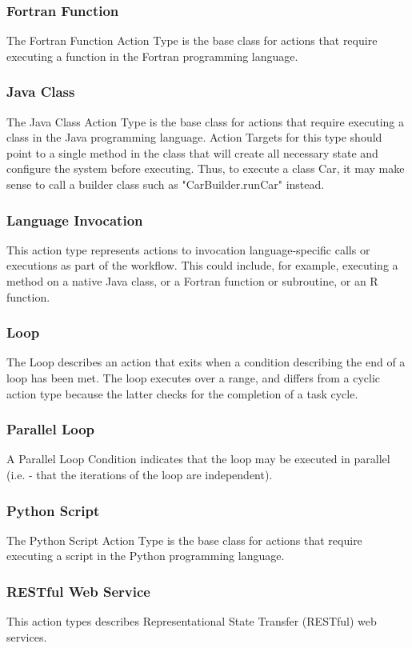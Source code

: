 			\subsubsection{
			Fortran Function
			}
			The Fortran Function Action Type is the base class for actions that require executing a function in the Fortran programming language.
			\subsubsection{
			Java Class
			}
			The Java Class Action Type is the base class for actions that require executing a class in the Java programming language. Action Targets for this type should point to a single method in the class that will create all necessary state and configure the system before executing. Thus, to execute a class Car, it may make sense to call a builder class such as "CarBuilder.runCar" instead.
			\subsubsection{
			Language Invocation
			}
			This action type represents actions to invocation language-specific calls or executions as part of the workflow. This could include, for example, executing a method on a native Java class, or a Fortran function or subroutine, or an R function.
			\subsubsection{
			Loop
			}
			The Loop describes an action that exits when a condition describing the end of a loop has been met. The loop executes over a range, and differs from a cyclic action type because the latter checks for the completion of a task cycle.
			\subsubsection{
			Parallel Loop
			}
			A Parallel Loop Condition indicates that the loop may be executed in parallel (i.e. - that the iterations of the loop are independent).
			\subsubsection{
			Python Script
			}
			The Python Script Action Type is the base class for actions that require executing a script in the Python programming language.
			\subsubsection{
			RESTful Web Service
			}
			This action types describes Representational State Transfer (RESTful) web services.
